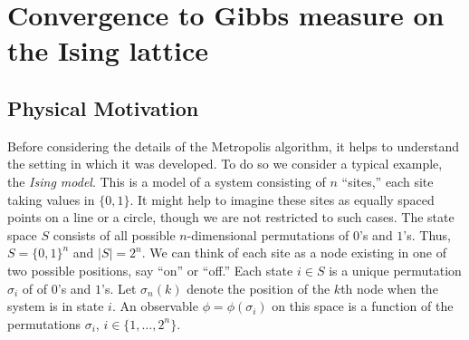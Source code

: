 
\chapter{Convergence to Gibbs measure on the Ising lattice}
\label{cha:an-appl-conv}

\section{Physical Motivation}
\label{sec:physical-motivation}
Before considering the details of the Metropolis algorithm, it helps to
understand the setting in which it was developed. To do so we consider a
typical example, the \emph{Ising model}. This is a model of a system consisting
of $n$ ``sites,'' each site taking values in 
$\{0, 1\}$. 
It might 
help to imagine these sites as equally spaced points on a line or a circle,
though we are not restricted to such cases. 
The state space $S$ consists of
all possible $n$-dimensional permutations of $0$'s and $1$'s. 
Thus, $S = \{0, 1\}^n$ and $|S| = 2^n$. We can think of each
site as a node existing in one of two possible positions, say ``on'' or
``off.'' Each state $i \in S$ is %
a unique permutation $\sigma_i$ of of $0$'s and $1$'s. 
Let $\sigma_n(k)$ denote the position %
of the $k$th node when the system is in state $i$. 
An observable $\phi = \phi(\sigma_i)$ on this space is a function of
the permutations $\sigma_i$, $i\in \{1,\dots, 2^n\}$.
%
%
%
%

